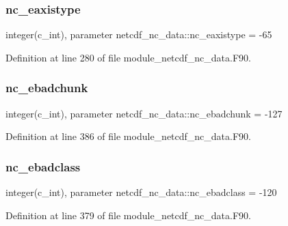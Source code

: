\mbox{\label{namespacenetcdf__nc__data_af7013322b1cad29cb08115055161b135}} 
\subsubsection{\texorpdfstring{nc\+\_\+eaxistype}{nc\_eaxistype}}
{\footnotesize\ttfamily integer(c\+\_\+int), parameter netcdf\+\_\+nc\+\_\+data\+::nc\+\_\+eaxistype = -\/65}



Definition at line 280 of file module\+\_\+netcdf\+\_\+nc\+\_\+data.\+F90.

\mbox{\label{namespacenetcdf__nc__data_aee928b81bad0c1efcd654ac94cc1629c}} 
\subsubsection{\texorpdfstring{nc\+\_\+ebadchunk}{nc\_ebadchunk}}
{\footnotesize\ttfamily integer(c\+\_\+int), parameter netcdf\+\_\+nc\+\_\+data\+::nc\+\_\+ebadchunk = -\/127}



Definition at line 386 of file module\+\_\+netcdf\+\_\+nc\+\_\+data.\+F90.

\mbox{\label{namespacenetcdf__nc__data_a49f4c888b7013c4b35a2cb7932aa5a2a}} 
\subsubsection{\texorpdfstring{nc\+\_\+ebadclass}{nc\_ebadclass}}
{\footnotesize\ttfamily integer(c\+\_\+int), parameter netcdf\+\_\+nc\+\_\+data\+::nc\+\_\+ebadclass = -\/120}



Definition at line 379 of file module\+\_\+netcdf\+\_\+nc\+\_\+data.\+F90.

